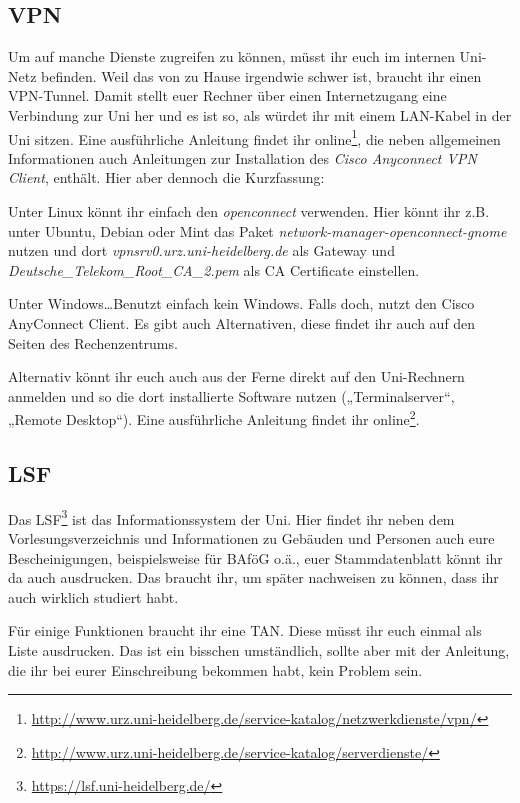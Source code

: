 \subsection*{VPN}
Um auf manche Dienste zugreifen zu können, müsst ihr euch im internen Uni-Netz befinden. Weil das von zu Hause irgendwie schwer ist, braucht ihr einen VPN-Tunnel. Damit stellt euer Rechner über einen Internetzugang eine Verbindung zur Uni her und es ist so, als würdet ihr mit einem LAN-Kabel in der Uni sitzen. Eine ausführliche Anleitung findet ihr online\footnote{\url{http://www.urz.uni-heidelberg.de/service-katalog/netzwerkdienste/vpn/}}, die neben allgemeinen Informationen auch Anleitungen zur Installation des \emph{Cisco Anyconnect VPN Client}, enthält. Hier aber dennoch die Kurzfassung:

Unter Linux könnt ihr einfach den \emph{openconnect} verwenden. Hier könnt ihr z.B. unter Ubuntu, Debian oder Mint das Paket \emph{network-manager-openconnect-gnome} nutzen und dort \emph{vpnsrv0.urz.uni-heidelberg.de} als Gateway und \emph{Deutsche\_Telekom\_Root\_CA\_2.pem} als CA Certificate einstellen.

Unter Windows\ldots Benutzt einfach kein Windows. Falls doch, nutzt den Cisco AnyConnect Client. Es gibt auch Alternativen, diese findet ihr auch auf den Seiten des Rechenzentrums.

Alternativ könnt ihr euch auch aus der Ferne direkt auf den Uni-Rechnern anmelden und so die dort installierte Software nutzen („Terminalserver“, „Remote Desktop“). Eine ausführliche Anleitung findet ihr online\footnote{\url{http://www.urz.uni-heidelberg.de/service-katalog/serverdienste/}}.

\subsection*{LSF}
Das LSF\footnote{\url{https://lsf.uni-heidelberg.de/}} ist das Informationssystem der Uni. Hier findet ihr neben dem Vorlesungsverzeichnis und Informationen zu Gebäuden und Personen auch eure Bescheinigungen, beispielsweise für BAföG o.ä., euer Stammdatenblatt könnt ihr da auch ausdrucken. Das braucht ihr, um später nachweisen zu können, dass ihr auch wirklich studiert habt.

Für einige Funktionen braucht ihr eine TAN. Diese müsst ihr euch einmal als Liste ausdrucken. Das ist ein bisschen umständlich, sollte aber mit der Anleitung, die ihr bei eurer Einschreibung bekommen habt, kein Problem sein.

